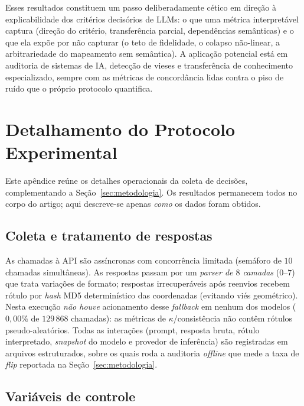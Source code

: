 \documentclass[12pt,a4paper]{article}
\begin{document}
Esses resultados constituem um passo deliberadamente cético em direção à explicabilidade
dos critérios decisórios de LLMs: o que uma métrica interpretável captura (direção do
critério, transferência parcial, dependências semânticas) e o que ela expõe por não
capturar (o teto de fidelidade, o colapso não-linear, a arbitrariedade do mapeamento sem
semântica). A aplicação potencial está em auditoria de sistemas de IA, detecção de vieses e
transferência de conhecimento especializado, sempre com as métricas de concordância lidas
contra o piso de ruído que o próprio protocolo quantifica.

\appendix

\section{Detalhamento do Protocolo Experimental}
\label{ap:coleta}

Este apêndice reúne os detalhes operacionais da coleta de decisões, complementando a
Seção~\ref{sec:metodologia}. Os resultados permanecem todos no corpo do artigo; aqui
descreve-se apenas \emph{como} os dados foram obtidos.

\subsection{Coleta e tratamento de respostas}

As chamadas à API são assíncronas com concorrência limitada (semáforo de $10$ chamadas
simultâneas). As respostas passam por um \emph{parser
de $8$ camadas} ($0$–$7$) que trata variações de formato; respostas irrecuperáveis após
reenvios recebem rótulo por \emph{hash} MD5 determinístico das coordenadas (evitando viés
geométrico). Nesta execução \emph{não houve} acionamento desse \emph{fallback} em nenhum dos
modelos ($0{,}00\%$ de $129\,868$ chamadas): as métricas de $\kappa$/consistência não contêm
rótulos pseudo-aleatórios. Todas as interações (prompt, resposta bruta, rótulo
interpretado, \emph{snapshot} do modelo e provedor de inferência) são registradas em
arquivos estruturados, sobre os quais roda a auditoria \emph{offline} que mede a taxa de
\emph{flip} reportada na Seção~\ref{sec:metodologia}.

\subsection{Variáveis de controle}
\end{document}
